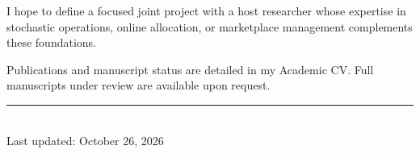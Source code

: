 \documentclass[11pt]{article}
\begin{document}
I hope to define a focused joint project with a host researcher whose expertise in stochastic operations, online allocation, or marketplace management complements these foundations.


\medskip
{\footnotesize Publications and manuscript status are detailed in my Academic CV.
Full manuscripts under review are available upon request.}
\begin{center}
\rule{0.25\linewidth}{0.4pt}\\
\medskip
Last updated: October 26, 2026
\end{center}
\end{document}
